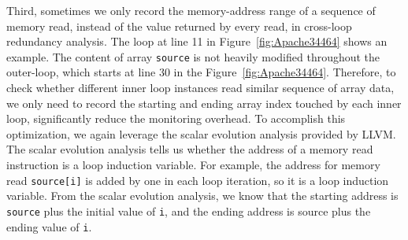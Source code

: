 Third, sometimes we only record the memory-address range of a sequence of memory
read, instead of the value returned by every read, in cross-loop redundancy
analysis. 
The loop at line 11 in Figure~\ref{fig:Apache34464} shows an example.
The content of array \texttt{source} is not heavily modified
throughout the outer-loop, which starts 
at line 30 in the Figure~\ref{fig:Apache34464}.
Therefore, to check whether different inner loop instances read similar
sequence of array data, we only need to record the starting and 
ending array index touched by each inner loop, significantly reduce the 
monitoring overhead. To accomplish this optimization, we again leverage
the scalar evolution analysis provided by LLVM. The scalar evolution analysis
tells us whether the address of a memory read instruction
is a loop induction variable. For example, the address for memory read \texttt{source[i]} is added by one in each loop iteration,
so it is a loop induction variable. 
From the scalar evolution analysis, we know that the starting address is \texttt{source} plus the initial value of \texttt{i}, and the ending address
is source plus the ending value of \texttt{i}.  

